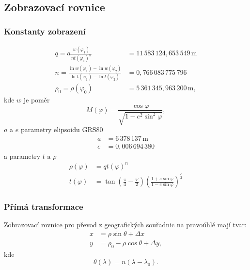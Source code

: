\documentclass[a4paper]{article}
\begin{document}
\subsection{Zobrazovací rovnice}
\subsubsection{Konstanty zobrazení}
\begin{align*}
q = a \frac{w(\varphi_1)}{n t(\varphi_1)^n} &= 11\,583\,124,653\,549\,\mathrm{m}\\
n = \frac{\ln{w(\varphi_1)} - \ln{w(\varphi_2)}}{\ln{t(\varphi_1)} - \ln{t(\varphi_2)}} &= 0,766\,083\,775\,796\\
\rho_0 = \rho(\varphi_0) &= 5\,361\,345,963\,200\,\mathrm{m},
\end{align*}
kde $w$ je poměr
\begin{equation*}
M(\varphi) = \frac{\cos{\varphi}}{\sqrt{1 - e^2 \sin^2{\varphi}}},
\end{equation*}
$a$ a $e$ parametry elipsoidu GRS80
\begin{align*}
a &= 6\,378\,137\,\mathrm{m}\\
e &= 0,006\,694\,380
\end{align*}
a parametry $t$ a $\rho$
\begin{align*}
\rho(\varphi) &= q t(\varphi)^n\\
t(\varphi) &= \tan{\left(\frac{\pi}{4} - \frac{\varphi}{2}\right)}\left(\frac{1+e\sin{\varphi}}{1-e\sin{\varphi}}\right)^{\frac{e}{2}}
\end{align*}

\subsubsection{Přímá transformace}
Zobrazovací rovnice pro převod z geografických souřadnic na pravoúhlé mají tvar:
\begin{align*}
x &= \rho \sin{\theta} + \Delta x\\
y &= \rho_0 - \rho \cos{\theta} + \Delta y,
\end{align*}
kde
\begin{equation*}
\theta(\lambda) = n (\lambda - \lambda_0).
\end{equation*}
  
\end{document}
